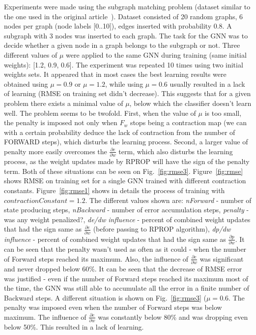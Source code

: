 \documentclass[]{spie}  %
\begin{document}
Experiments were made using the subgraph matching problem (dataset similar to the one used in the original article~\cite{scarselli2009graph}). Dataset consisted of 20 random graphs, 6 nodes per graph (node labels [0..10]), edges inserted with probability 0.8. A subgraph with 3 nodes was inserted to each graph. The task for the GNN was to decide whether a given node in a graph belongs to the subgraph or not. Three different values of $\mu$ were applied to the same GNN during training (same initial weights): [1.2, 0.9, 0.6]. The experiment was repeated 10 times using two initial weights sets. It appeared that in most cases the best learning results were obtained using $\mu = 0.9$ or $\mu = 1.2$, while using $\mu = 0.6$ usually resulted in a lack of learning (RMSE on training set didn't decrease). This suggests that for a given problem there exists a minimal value of $\mu$, below which the classifier doesn't learn well. The problem seems to be twofold. First, when the value of $\mu$ is too small, the penalty is imposed not only when $F_w$ stops being a contraction map (we can with a certain probability deduce the lack of contraction from the number of FORWARD steps), which disturbs the learning process. Second, a larger value of penalty more easily overcomes the $\frac{\partial e}{\partial w}$ term, which also disturbs the learning process, as the weight updates made by RPROP will have the sign of the penalty term. Both of these situations can be seen on Fig.~\ref{fig:rmse3}. Figure~\ref{fig:rmse} shows RMSE on training set for a single GNN trained with different contraction constants. Figure~\ref{fig:rmse1} shows in details the process of training with $contractionConstant = 1.2$. The different values shown are: \emph{nForward} - number of state producing steps, \emph{nBackward} - number of error accumulation steps, \emph{penalty} - was any weight penalized?, \emph{de/dw influence} - percent of combined weight updates that had the sign same as $\frac{\partial e}{\partial w}$ (before passing to RPROP algorithm), \emph{dp/dw influence} - percent of combined weight updates that had the sign same as $\frac{\partial p}{\partial w}$. It can be seen that the penalty wasn't used as often as it could - when the number of Forward steps reached its maximum. Also, the influence of $\frac{\partial e}{\partial w}$ was significant and never dropped below 60\%. It can be seen that the decrease of RMSE error was justified - even if the number of Forward steps reached its maximum most of the time, the GNN was still able to accumulate all the error in a finite number of Backward steps. A different situation is shown on Fig.~\ref{fig:rmse3} ($\mu = 0.6$. The penalty was imposed even when the number of Forward steps was below maximum. The influence of $\frac{\partial e}{\partial w}$ was constantly below 80\% and was dropping even below 50\%. This resulted in a lack of learning.
\end{document}
